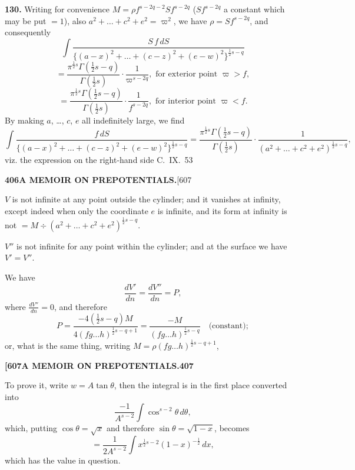 \documentclass[11pt,a4paper]{book}
\begin{document}
{\medskip
\noindent\textbf{130.}
Writing for convenience $M = \rho f^{s-2q-2} Sf^{s-2q}$ ($Sf^{s-2q}$ a constant which may be put $= 1$), also $a^2 + \ldots + c^2 + e^2 = \varpi^2$, we have $\rho = Sf^{s-2q}$, and consequently
\[
\int \frac{S\, f\, dS}{\{(a-x)^2 + \ldots + (c-z)^2 + (e-w)^2\}^{\frac{1}{2}s-q}}
\]
\[
= \frac{\pi^{\frac{1}{2}s}\Gamma(\frac{1}{2}s-q)}{\Gamma(\frac{1}{2}s)} \cdot \frac{1}{\varpi^{s-2q}}, \text{ for exterior point } \varpi > f,
\]
\[
= \frac{\pi^{\frac{1}{2}s}\Gamma(\frac{1}{2}s-q)}{\Gamma(\frac{1}{2}s)} \cdot \frac{1}{f^{s-2q}}, \text{ for interior point } \varpi < f.
\]
By making $a$, \ldots, $c$, $e$ all indefinitely large, we find
\[
\int \frac{f\,dS}{\{(a-x)^2 + \ldots + (c-z)^2 + (e-w)^2\}^{\frac{1}{2}s-q}} = \frac{\pi^{\frac{1}{2}s}\Gamma(\frac{1}{2}s-q)}{\Gamma(\frac{1}{2}s)} \cdot \frac{1}{(a^2 + \ldots + c^2 + e^2)^{\frac{1}{2}s-q}},
\]
viz. the expression on the right-hand side
\hfill C.~IX.\ 53

\newpage
\noindent\textbf{406}\hspace{\fill}\textbf{A MEMOIR ON PREPOTENTIALS.}\hspace{\fill}[607

$V$ is not infinite at any point outside the cylinder; and it vanishes at infinity, except indeed when only the coordinate $e$ is infinite, and its form at infinity is not $= M \div (a^2 + \ldots + c^2 + e^2)^{\frac{1}{2}s-q}$.

$V''$ is not infinite for any point within the cylinder; and at the surface we have $V' = V''$.

We have
\[
\frac{dV'}{dn} = \frac{dV''}{dn} = P,
\]
where $\frac{dV''}{dn} = 0$, and therefore
\[
P = \frac{-4(\frac{1}{2}s-q)M}{4(fg\ldots h)^{\frac{1}{2}s-q+1}} = \frac{-M}{(fg\ldots h)^{\frac{1}{2}s-q}} \quad \text{(constant)};
\]
or, what is the same thing, writing $M = \rho (fg\ldots h)^{\frac{1}{2}s-q+1}$,

\newpage
\noindent\textbf{[607}\hspace{\fill}\textbf{A MEMOIR ON PREPOTENTIALS.}\hspace{\fill}\textbf{407}

To prove it, write $w = A\tan\theta$, then the integral is in the first place converted into
\[
\frac{-1}{A^{s-2}} \int \cos^{s-2}\theta\, d\theta,
\]
which, putting $\cos\theta = \sqrt{x}$ and therefore $\sin\theta = \sqrt{1-x}$, becomes
\[
= \frac{1}{2A^{s-2}} \int x^{\frac{1}{2}s-2}(1-x)^{-\frac{1}{2}}\, dx,
\]
which has the value in question.

}
\end{document}
